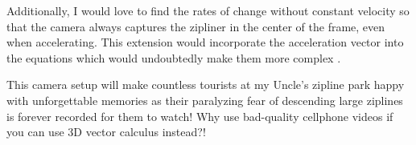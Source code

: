 \documentclass[12pt]{article}
\begin{document}
Additionally, I would love to find the rates of change without constant velocity so that the camera always captures the zipliner in the center of the frame, even when accelerating. This extension would incorporate the acceleration vector into the equations which would undoubtedly make them more complex \autocite{acceleration}. 

\vspace{30pt}

This camera setup will make countless tourists at my Uncle's zipline park happy with unforgettable memories as their paralyzing fear of descending large ziplines is forever recorded for them to watch! Why use bad-quality cellphone videos if you can use 3D vector calculus instead?!

\newpage
\printbibliography
\end{document}
